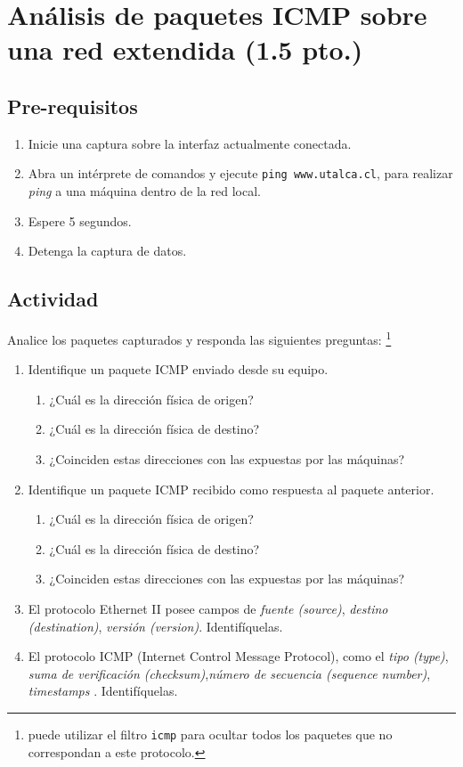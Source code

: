 \documentclass[11pt]{utalcaDoc}
\begin{document}
\section{Análisis de paquetes ICMP sobre una red extendida (1.5 pto.)}
\subsection{Pre-requisitos}
\begin{enumerate}
    \item{ Inicie una captura sobre la interfaz actualmente conectada. }
    \item{ Abra un intérprete de comandos y ejecute \texttt{ping www.utalca.cl},
    para realizar \emph{ping} a una máquina dentro de la red local. }
    \item{ Espere 5 segundos. }
    \item{ Detenga la captura de datos. }
\end{enumerate}
\subsection{Actividad}
Analice los paquetes capturados y responda las siguientes preguntas: 
\footnote{puede utilizar el filtro \texttt{icmp} para ocultar todos los 
paquetes que no correspondan a este protocolo.}
\begin{enumerate}
    \item{ Identifique un paquete ICMP enviado desde su equipo. 
        \begin{enumerate}
            \item { ¿Cuál es la dirección física de origen?}
            \item { ¿Cuál es la dirección física de destino?}
            \item { ¿Coinciden estas direcciones con las expuestas por las máquinas?}
        \end{enumerate}
    }
    \item{ Identifique un paquete ICMP recibido como respuesta al paquete anterior. 
        \begin{enumerate}
            \item { ¿Cuál es la dirección física de origen?}
            \item { ¿Cuál es la dirección física de destino?}
            \item { ¿Coinciden estas direcciones con las expuestas por las máquinas?}
        \end{enumerate}
    }
    \item{ El protocolo Ethernet II posee campos de \emph{fuente (source)}, 
    \emph{destino (destination)}, \emph{versión (version)}. Identifíquelas.} 

    \item{ El protocolo ICMP (Internet Control Message Protocol), como el \emph{tipo (type)},
    \emph{suma de verificación (checksum)},\emph{número de secuencia (sequence number)},
    \emph{timestamps} }. Identifíquelas.
\end{enumerate}
\end{document}
